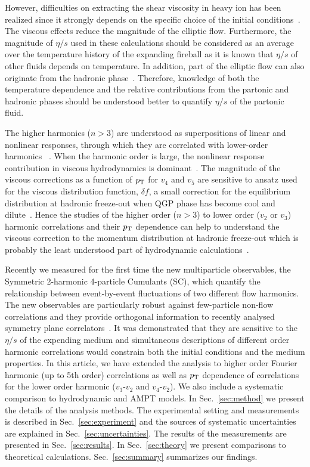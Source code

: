 \documentclass[ALICE,manyauthors]{cernphprep}
\begin{document}
However, difficulties on extracting the shear viscosity in heavy ion has been realized since it strongly depends on the specific choice of the initial conditions~\cite{Romatschke:2007mq,Luzum:2012wu,Shen:2011zc}.
The viscous effects reduce the magnitude of the elliptic flow. Furthermore, the magnitude of $\eta/s$ used in these calculations should be considered as an average over the temperature history of the expanding fireball as it is known that $\eta/s$ of other fluids depends on temperature. 
In addition, part of the elliptic flow can also originate from the hadronic phase~\cite{Bozek:2011ua,Rose:2014fba,Ryu:2015vwa}. Therefore,
knowledge of both the temperature dependence and the relative contributions from the partonic and hadronic phases should be understood better to quantify $\eta/s$ of the partonic fluid.

The higher harmonics ($n>3$) are understood as superpositions of linear and nonlinear responses, through which they are correlated with lower-order harmonics ~\cite{Teaney:2012ke,Bravina:2013ora}. When the harmonic order is large, the nonlinear response contribution in viscous hydrodynamics is dominant~\cite{Teaney:2012ke,Bravina:2013ora}.
The magnitude of the viscous corrections as a function of $p_{\textnormal{T}}{}$ for $v_4$ and $v_5$ are sensitive to ansatz used for the viscous distribution function, $\delta f$, a small correction for the equilibrium distribution at hadronic freeze-out when QGP phase has become cool and dilute~\cite{Luzum:2010ad}.
Hence the studies of the higher order ($n>3$) to lower order ($v_2$ or $v_3$) harmonic correlations and their $p_{\textnormal{T}}{}$ dependence can help to understand the viscous correction to the momentum distribution at hadronic freeze-out which is probably the least understood part of hydrodynamic calculations~\cite{Teaney:2012ke,Niemi:2015qia}.

Recently we measured for the first time the new multiparticle observables, the Symmetric 2-harmonic 4-particle Cumulants (SC), which quantify the relationship between event-by-event fluctuations of two different flow harmonics. The new observables are particularly robust against few-particle non-flow correlations and they provide orthogonal information to recently analysed symmetry plane correlators~\cite{ALICE:2016kpq}. 
It was demonstrated that they are sensitive to the $\eta/s$ of the expending medium and simultaneous descriptions of different order harmonic correlations would constrain 
both the initial conditions and the medium properties.
In this article, we have extended the analysis to higher order Fourier harmonic (up to 5th order) correlations as well as $p_{\textnormal{T}}{}$ dependence of correlations for the lower order harmonic ($v_3$-$v_2$ and $v_4$-$v_2$).  We also include a systematic comparison to hydrodynamic and AMPT models.
In Sec.~\ref{sec:method} we present the details of the analysis methods. The experimental setting and measurements is described in Sec.~\ref{sec:experiment} and the sources of systematic uncertainties are explained in Sec.~\ref{sec:uncertainties}. The results of the measurements are presented in Sec.~\ref{sec:results}.
 In Sec.~\ref{sec:theory} we present comparisons to theoretical calculations. Sec.~\ref{sec:summary} summarizes our findings.
 
\end{document}
